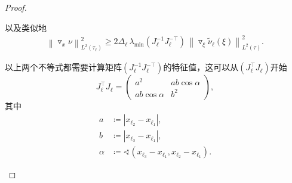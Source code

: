 \begin{proof}
\begin{enumerate}
  以及类似地
  \begin{equation*}
    \begin{split}
      \left\| \triangledown_{x} \nu \right\|_{L^{2}(\tau_{\ell})}^2
      \ge 2 \Delta_{\ell} \, \lambda_{\min} \left(J_{\ell}^{-1} J_{\ell}^{-\top} \right) \,
      \left\|
      \triangledown_{\xi} \widetilde{\nu}_{\ell} (\xi)
      \right\|_{L^{2}(\tau)}^{2}.
    \end{split}
  \end{equation*}

  以上两个不等式都需要计算矩阵$\left(J_{\ell}^{-1} J_{\ell}^{-\top} \right)$的特征值，这可以从$\left(J_{\ell}^{\top} J_{\ell} \right)$开始
  \begin{equation*}
    J_{\ell}^{\top} J_{\ell} =
    \begin{pmatrix}
      a^{2} & a b \cos \alpha \\
      a b \cos \alpha & b^{2}
    \end{pmatrix},
  \end{equation*}
  其中
\begin{equation*}
  \begin{split}
    a & \coloneqq \left| x_{\ell_{2}} - x_{\ell_{1}} \right|, \\
    b & \coloneqq \left| x_{\ell_{3}} - x_{\ell_{1}} \right|, \\
    \alpha  & \coloneqq \sphericalangle
    \left( x_{\ell_{3}} - x_{\ell_{1}}, x_{\ell_{2}} - x_{\ell_{1}} \right).
  \end{split}
\end{equation*}


\end{enumerate}
\end{proof}
